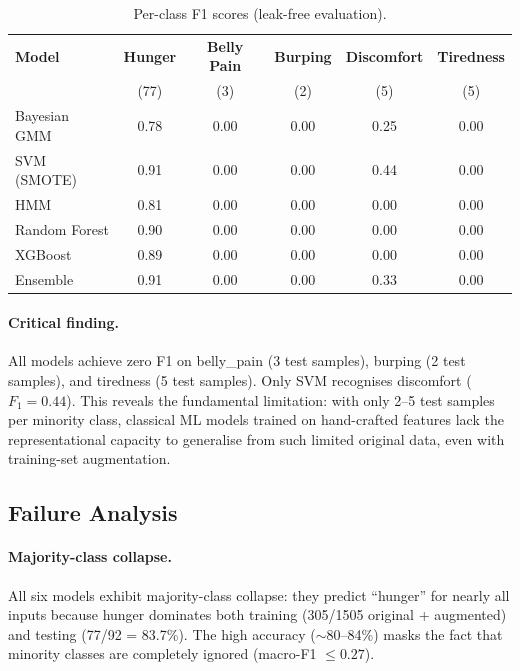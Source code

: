 \documentclass[11pt,a4paper]{article}
\begin{document}
\begin{table}[H]
\centering
\caption{Per-class F1 scores (leak-free evaluation).}
\label{tab:perclass}
\begin{tabular}{lccccc}
\toprule
\textbf{Model} & \textbf{Hunger} & \textbf{Belly Pain} & \textbf{Burping} & \textbf{Discomfort} & \textbf{Tiredness} \\
 & (77) & (3) & (2) & (5) & (5) \\
\midrule
Bayesian GMM   & 0.78 & 0.00 & 0.00 & 0.25 & 0.00 \\
SVM (SMOTE)    & 0.91 & 0.00 & 0.00 & 0.44 & 0.00 \\
HMM            & 0.81 & 0.00 & 0.00 & 0.00 & 0.00 \\
Random Forest  & 0.90 & 0.00 & 0.00 & 0.00 & 0.00 \\
XGBoost        & 0.89 & 0.00 & 0.00 & 0.00 & 0.00 \\
Ensemble       & 0.91 & 0.00 & 0.00 & 0.33 & 0.00 \\
\bottomrule
\end{tabular}
\end{table}

\paragraph{Critical finding.}
All models achieve zero F1 on belly\_pain (3 test samples),
burping (2 test samples), and tiredness (5 test samples). Only SVM
recognises discomfort ($F_1 = 0.44$). This reveals the fundamental
limitation: with only 2--5 test samples per minority class, classical
ML models trained on hand-crafted features lack the representational
capacity to generalise from such limited original data, even with
training-set augmentation.

\subsection{Failure Analysis}
\label{sec:failure}

\paragraph{Majority-class collapse.}
All six models exhibit majority-class collapse: they predict
``hunger'' for nearly all inputs because hunger dominates both
training (305/1505 original + augmented) and testing (77/92 = 83.7\%).
The high accuracy ($\sim$80--84\%) masks the fact that minority classes
are completely ignored (macro-F1 $\leq 0.27$).
\end{document}
